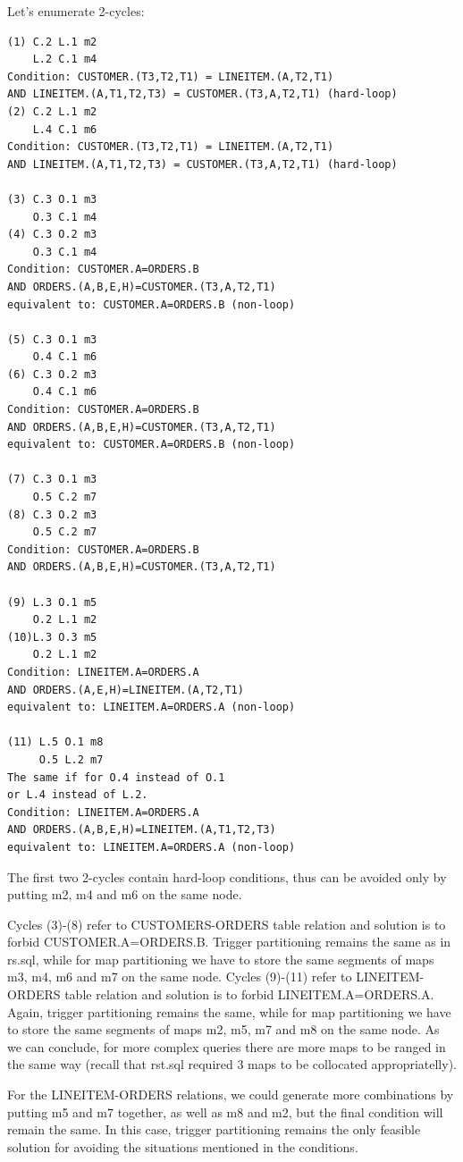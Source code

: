 \documentclass{sig-semester}
\begin{document}
\newpage
Let's enumerate 2-cycles:
\begin{verbatim}
(1) C.2 L.1 m2
    L.2 C.1 m4
Condition: CUSTOMER.(T3,T2,T1) = LINEITEM.(A,T2,T1) 
AND LINEITEM.(A,T1,T2,T3) = CUSTOMER.(T3,A,T2,T1) (hard-loop)
(2) C.2 L.1 m2   
    L.4 C.1 m6
Condition: CUSTOMER.(T3,T2,T1) = LINEITEM.(A,T2,T1)
AND LINEITEM.(A,T1,T2,T3) = CUSTOMER.(T3,A,T2,T1) (hard-loop)

(3) C.3 O.1 m3
    O.3 C.1 m4
(4) C.3 O.2 m3
    O.3 C.1 m4
Condition: CUSTOMER.A=ORDERS.B
AND ORDERS.(A,B,E,H)=CUSTOMER.(T3,A,T2,T1)
equivalent to: CUSTOMER.A=ORDERS.B (non-loop)

(5) C.3 O.1 m3
    O.4 C.1 m6        
(6) C.3 O.2 m3
    O.4 C.1 m6
Condition: CUSTOMER.A=ORDERS.B
AND ORDERS.(A,B,E,H)=CUSTOMER.(T3,A,T2,T1)
equivalent to: CUSTOMER.A=ORDERS.B (non-loop)

(7) C.3 O.1 m3
    O.5 C.2 m7     
(8) C.3 O.2 m3
    O.5 C.2 m7
Condition: CUSTOMER.A=ORDERS.B
AND ORDERS.(A,B,E,H)=CUSTOMER.(T3,A,T2,T1)

(9) L.3 O.1 m5
    O.2 L.1 m2
(10)L.3 O.3 m5
    O.2 L.1 m2
Condition: LINEITEM.A=ORDERS.A
AND ORDERS.(A,E,H)=LINEITEM.(A,T2,T1)
equivalent to: LINEITEM.A=ORDERS.A (non-loop)

(11) L.5 O.1 m8
     O.5 L.2 m7
The same if for O.4 instead of O.1
or L.4 instead of L.2.
Condition: LINEITEM.A=ORDERS.A
AND ORDERS.(A,B,E,H)=LINEITEM.(A,T1,T2,T3)
equivalent to: LINEITEM.A=ORDERS.A (non-loop)
\end{verbatim}

The first two 2-cycles contain hard-loop conditions, thus can be avoided only by putting m2, m4 and m6 on the same node.

Cycles (3)-(8) refer to CUSTOMERS-ORDERS table relation and solution is to forbid CUSTOMER.A=ORDERS.B. Trigger partitioning remains the same as in rs.sql, while for map partitioning we have to store the same segments of  maps m3, m4, m6 and m7 on the same node. Cycles (9)-(11) refer to LINEITEM-ORDERS table relation and solution is to forbid LINEITEM.A=ORDERS.A. Again, trigger partitioning remains the same, while for map partitioning we have to store the same segments of maps m2, m5, m7 and m8 on the same node. As we can conclude, for more complex queries there are more maps to be ranged in the same way (recall that rst.sql required 3 maps to be collocated appropriatelly).

For the LINEITEM-ORDERS relations, we could generate more combinations by putting m5 and m7 together, as well as m8 and m2, but the final condition will remain the same. In this case, trigger partitioning remains the only feasible solution for avoiding the situations mentioned in the conditions.
\end{document}
